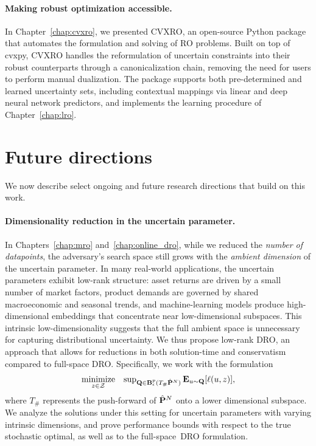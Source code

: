 \paragraph{Making robust optimization accessible.}
In Chapter~\ref{chap:cvxro}, we presented \gls{CVXRO}, an open-source Python package that automates the formulation and solving of \gls{RO} problems.
Built on top of cvxpy, \gls{CVXRO} handles the reformulation of uncertain constraints into their robust counterparts through a canonicalization chain, removing the need for users to perform manual dualization.
The package supports both pre-determined and learned uncertainty sets, including contextual mappings via linear and deep neural network predictors, and implements the learning procedure of Chapter~\ref{chap:lro}.

\section{Future directions}
We now describe select ongoing and future research directions that build on this work.

\paragraph{Dimensionality reduction in the uncertain parameter.}
In Chapters~\ref{chap:mro} and~\ref{chap:online_dro}, while we reduced the {\it number of datapoints}, the adversary's search space still grows with the {\it ambient dimension} of the uncertain parameter. In many real-world applications, the uncertain parameters exhibit low-rank structure: asset returns are driven by a small number of market factors, product demands are governed by shared macroeconomic and seasonal trends, and machine-learning models produce high-dimensional embeddings that concentrate near low-dimensional subspaces. This intrinsic low-dimensionality suggests that the full ambient space is unnecessary for capturing distributional uncertainty. We thus propose low-rank DRO, an approach that allows for reductions in both solution-time and conservatism compared to full-space DRO. Specifically, we work with the formulation
\begin{equation*}
\label{eq:dro_prob_future}
	\begin{array}{ll}
		\underset{z \in \mathcal{Z}}{\text{minimize}} & \sup_{\mathbf{Q} \in  \mathbf{B}_\epsilon^p (T_\# \hat{{\mathbf P}}^N) } \mathbf{E}_{u \sim \mathbf{Q}}[\ell(u,z)],
	\end{array}
\end{equation*}
where $T_\#$ represents the push-forward of $\hat{{\mathbf P}}^N$ onto a lower dimensional subspace. 
We analyze the solutions under this setting for uncertain parameters with varying intrinsic dimensions, and prove performance bounds with respect to the true stochastic optimal, as well as to the full-space~\gls{DRO} formulation. 

